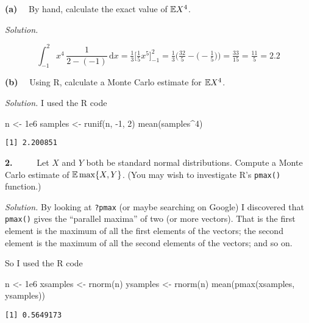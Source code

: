 \documentclass[
  letterpaper,
  DIV=11,
  numbers=noendperiod]{scrreprt}
\newenvironment{Shaded}{\begin{snugshade}}{\end{snugshade}}
\newcommand{\DecValTok}[1]{\textcolor[rgb]{0.68,0.00,0.00}{#1}}
\newcommand{\FloatTok}[1]{\textcolor[rgb]{0.68,0.00,0.00}{#1}}
\newcommand{\FunctionTok}[1]{\textcolor[rgb]{0.28,0.35,0.67}{#1}}
\newcommand{\NormalTok}[1]{\textcolor[rgb]{0.00,0.23,0.31}{#1}}
\newcommand{\OtherTok}[1]{\textcolor[rgb]{0.00,0.23,0.31}{#1}}
\newcommand{\SpecialCharTok}[1]{\textcolor[rgb]{0.37,0.37,0.37}{#1}}
\theoremstyle{plain}
\theoremstyle{definition}
\theoremstyle{definition}
\theoremstyle{remark}
\begin{document}
\textbf{(a)} ~~By hand, calculate the exact value of \(\mathbb{E} X^4\).

\emph{Solution.}

\[\int_{-1}^2 x^4\,\frac{1}{2-(-1)}\,\mathrm{d}x = \tfrac13 \Big[\tfrac15x^5\Big]_{-1}^2 = \tfrac13\Big(\tfrac{32}{5}-\big(-\tfrac15\big)\Big) = \tfrac{33}{15} = \tfrac{11}{5} = 2.2\]

\textbf{(b)} ~~Using R, calculate a Monte Carlo estimate for
\(\mathbb{E} X^4\).

\emph{Solution.} I used the R code

\begin{Shaded}
\begin{Highlighting}[]
\NormalTok{n }\OtherTok{\textless{}{-}} \FloatTok{1e6}
\NormalTok{samples }\OtherTok{\textless{}{-}} \FunctionTok{runif}\NormalTok{(n, }\SpecialCharTok{{-}}\DecValTok{1}\NormalTok{, }\DecValTok{2}\NormalTok{)}
\FunctionTok{mean}\NormalTok{(samples}\SpecialCharTok{\^{}}\DecValTok{4}\NormalTok{)}
\end{Highlighting}
\end{Shaded}

\begin{verbatim}
[1] 2.200851
\end{verbatim}

\textbf{2.} ~~~~~Let \(X\) and \(Y\) both be standard normal
distributions. Compute a Monte Carlo estimate of \(\operatorname{\mathbb{E}} \max\{X,Y\}\).
(You may wish to investigate R's \texttt{pmax()} function.)

\emph{Solution.} By looking at \texttt{?pmax} (or maybe searching on
Google) I discovered that \texttt{pmax()} gives the ``parallel maxima''
of two (or more vectors). That is the first element is the maximum of
all the first elements of the vectors; the second element is the maximum
of all the second elements of the vectors; and so on.

So I used the R code

\begin{Shaded}
\begin{Highlighting}[]
\NormalTok{n }\OtherTok{\textless{}{-}} \FloatTok{1e6}
\NormalTok{xsamples }\OtherTok{\textless{}{-}} \FunctionTok{rnorm}\NormalTok{(n)}
\NormalTok{ysamples }\OtherTok{\textless{}{-}} \FunctionTok{rnorm}\NormalTok{(n)}
\FunctionTok{mean}\NormalTok{(}\FunctionTok{pmax}\NormalTok{(xsamples, ysamples))}
\end{Highlighting}
\end{Shaded}

\begin{verbatim}
[1] 0.5649173
\end{verbatim}
\end{document}
